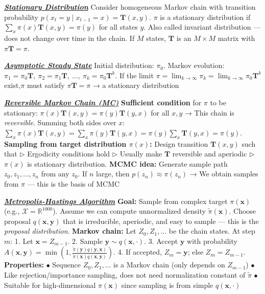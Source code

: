 \documentclass[10pt]{article}
\newcommand{\bulletPoint}[1]{\ul{\textit{\textbf{#1}}}}
\begin{document}
\begin{multicols*}{2}
\bulletPoint{Stationary Distribution}\quad
Consider homogeneous Markov chain with transition probability $p(x_t = y \mid x_{t-1} = x) = \mathbf{T}(x, y)$. 
$\pi$ is a stationary distribution if $\sum_x \pi(x)\mathbf{T}(x, y) = \pi(y)$ for all states $y$. 
Also called invariant distribution — does not change over time in the chain. 
If $M$ states, $\mathbf{T}$ is an $M \times M$ matrix with $\pi \mathbf{T} = \pi$. 

\bulletPoint{Asymptotic Steady State}\quad
Initial distribution: $\pi_0$. 
Markov evolution: $\pi_1 = \pi_0 \mathbf{T}, \ \pi_2 = \pi_1 \mathbf{T}, \ \dots, \ \pi_k = \pi_0 \mathbf{T}^k$. 
If the limit $\pi = \lim_{k \to \infty} \pi_k = \lim_{k \to \infty} \pi_0 \mathbf{T}^k$ exist,$\pi$ must satisfy $\pi \mathbf{T} = \pi$ → a stationary distribution



\bulletPoint{Reversible Markov Chain (MC)}\quad
\textbf{Sufficient condition} for $\pi$ to be stationary: $\pi(x)\mathbf{T}(x,y) = \pi(y)\mathbf{T}(y,x)$ for all $x, y$  
→ This chain is \textit{reversible}. 
Summing both sides over $x$:  
$\sum_x \pi(x)\mathbf{T}(x,y) = \sum_x \pi(y)\mathbf{T}(y,x) = \pi(y)\sum_x \mathbf{T}(y,x) = \pi(y)$. 
\textbf{Sampling from target distribution $\pi(x)$:}  
Design transition $\mathbf{T}(x,y)$ such that  
$\triangleright$ Ergodicity conditions hold  
$\triangleright$ Usually make $\mathbf{T}$ reversible and aperiodic  
$\triangleright$ $\pi(x)$ is stationary distribution. 
\textbf{MCMC idea:}  
Generate sample path $z_0, z_1, \dots, z_n$ from any $z_0$.   
If $n$ large, then $p(z_n) \approx \pi(z_n)$  
→ We obtain samples from $\pi$ — this is the basis of MCMC


\bulletPoint{Metropolis-Hastings Algorithm} \quad
\textbf{Goal:} Sample from complex target $\pi(\mathbf{x})$ (e.g., $\mathcal{X} = \mathbb{R}^{1000}$). 
Assume we can compute unnormalized density $\tilde{\pi}(\mathbf{x})$. 
Choose proposal $q(\mathbf{x}, \mathbf{y})$ that is irreducible, aperiodic, and easy to sample — this is the \textit{proposal distribution}. 
\textbf{Markov chain:} Let $Z_0, Z_1, \dots$ be the chain states. At step $m$:
1. Let $\mathbf{x} = Z_{m-1}$.  
2. Sample $\mathbf{y} \sim q(\mathbf{x}, \cdot)$.   
3. Accept $\mathbf{y}$ with probability  
$A(\mathbf{x}, \mathbf{y}) = \min\left(1, \frac{\tilde{\pi}(\mathbf{y})q(\mathbf{y}, \mathbf{x})}{\tilde{\pi}(\mathbf{x})q(\mathbf{x}, \mathbf{y})} \right)$.   
4. If accepted, $Z_m = \mathbf{y}$; else $Z_m = Z_{m-1}$. 
\textbf{Properties:}  
$\bullet$ Sequence $Z_0, Z_1, \dots$ is a Markov chain (only depends on $Z_{m-1}$)  
$\bullet$ Like rejection/importance sampling, does not need normalization constant of $\tilde{\pi}$  
$\bullet$ Suitable for high-dimensional $\pi(\mathbf{x})$ since sampling is from simple $q(\mathbf{x}, \cdot)$



\end{multicols*}
\end{document}
